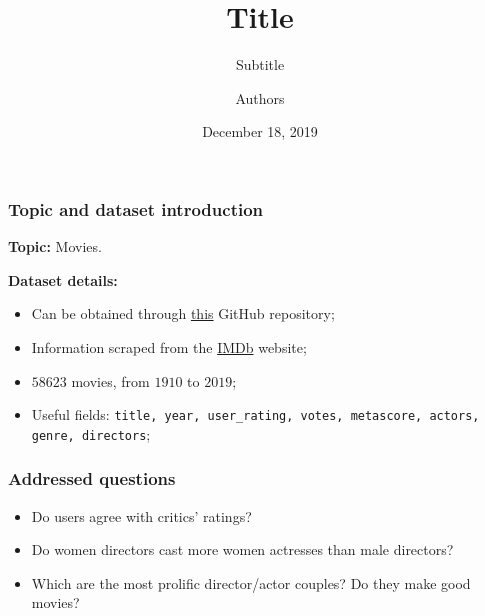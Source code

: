 \documentclass[aspectratio=169]{beamer}
\title{Title}
\subtitle{Subtitle}
\author{Authors}
\date{December 18, 2019}
\institute{DSSC - Data Visualisation Exam}
\begin{document}
  \setcounter{showSlideNumbers}{0}

  \frame{\titlepage}


  \setcounter{framenumber}{0}
  \setcounter{showSlideNumbers}{1}


  \begin{frame}
    \frametitle{Topic and dataset introduction}

    \textbf{Topic:} Movies.

    \vspace{1em} 

    \textbf{Dataset details:} 

    \vspace{0.5em} 

    \begin{itemize}
      \setlength\itemsep{1em}
      \item Can be obtained through \href{https://github.com/dojutsu-user/IMDB-Scraper}{this} GitHub repository;
      \item Information scraped from the \href{https://imdb.com}{IMDb} website;
      \item $58623$ movies, from $1910$ to $2019$;
      \item Useful fields: \texttt{title, year, user\_rating, votes, metascore, actors, genre, directors};
    \end{itemize}

    \vspace{1em} 


  \end{frame}



  \begin{frame}
    \frametitle{Addressed questions}

    \begin{itemize}
      \setlength\itemsep{1em}
      \item Do users agree with critics' ratings?
      \item Do women directors cast more women actresses than male directors?
      \item Which are the most prolific director/actor couples? Do they make good movies?
    \end{itemize}

  \end{frame}
\end{document}
